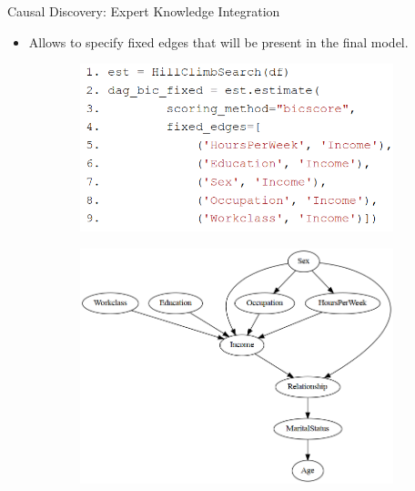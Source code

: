 \documentclass{beamer}
\begin{document}
\begin{frame}{Causal Discovery: Expert Knowledge Integration}
	\begin{itemize}
		\item Allows to specify fixed edges that will be present in the final model.
	\end{itemize}

	\vfill

	\begin{figure}
		\begin{subfigure}{0.5 \textwidth}
			\centering
			\includegraphics[scale=0.28]{imgs/adult_fixed.png}
		\end{subfigure}%
		\begin{subfigure}{0.5 \textwidth}
			\centering
			\includegraphics[scale=0.25]{imgs/adult_bic_fixed.png}
		\end{subfigure}
	\end{figure}
\end{frame}
\end{document}
